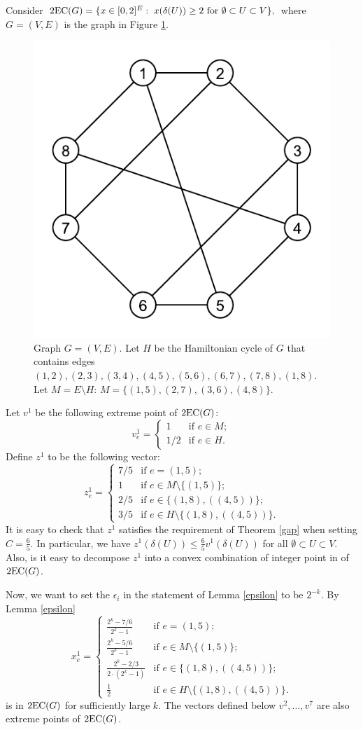 \begin{example}

Consider  $\operatorname{2EC}(G) = \{x\in [0,2]^E: \; x(\delta(U))\geq 2 \mbox{ for $\emptyset \subset U \subset V$}\},$ where $G=(V,E)$ is the graph in Figure \ref{example}. 
\begin{figure}[h]
	\centering
	\includegraphics[width=0.2\linewidth]{example.pdf}
	\caption{Graph $G=(V,E)$. Let $H$ be the Hamiltonian cycle of $G$ that contains edges $(1,2),(2,3),(3,4),(4,5),(5,6),(6,7),(7,8),(1,8)$. Let $M= E\setminus H$: $M=\{(1,5),(2,7),(3,6),(4,8)\}$.}
	\label{example}
\end{figure}

Let $v^1$ be the following extreme point of $\operatorname{2EC}(G)$: \begin{equation*}
v^1_{e} = \left\{ \begin{array}{ll}
1 & \mbox{if $e\in M$};\\
1/2 & \mbox{if $e\in H$}.
\end{array} \right. 
\end{equation*}
Define $z^1$ to be the following vector:
\begin{equation*}
z^1_{e} = \left\{ \begin{array}{ll}
7/5 & \mbox{if $e= (1,5)$};\\
1 & \mbox{if $e\in M\setminus \{(1,5)\}$};\\
2/5 & \mbox{if $e \in \{(1,8),((4,5))\}$};\\
3/5 & \mbox{if $e\in H\setminus\{(1,8),((4,5))\} $}.
\end{array} \right. 
\end{equation*}
It is easy to check that $z^1$ satisfies the requirement of Theorem \ref{gap} when setting $C=\frac{6}{5}$. In particular, we have $ z^1(\delta(U))\leq \frac{6}{5}v^1(\delta(U))$ for all $\emptyset\subset U \subset V$. Also, is it easy to decompose $z^1$ into a convex combination of integer point in of $\operatorname{2EC}(G)$.

Now, we want to set the $\epsilon_i$ in the statement of Lemma \ref{epsilon} to be $2^{-k}$. By Lemma \ref{epsilon}
\begin{equation*}
x^1_{e} = \left\{ \begin{array}{ll}
\frac{2^k-7/6}{2^k-1} & \mbox{if $e= (1,5)$};\\
\frac{2^k-5/6}{2^k-1} & \mbox{if $e\in M\setminus \{(1,5)\}$};\\
\frac{2^k- 2/3}{2\cdot (2^k-1)} & \mbox{if $e \in \{(1,8),((4,5))\}$};\\
\frac{1}{2} & \mbox{if $e\in H\setminus\{(1,8),((4,5))\} $}.
\end{array} \right. 
\end{equation*}
is in $\operatorname{2EC}(G)$ for sufficiently large $k$. The vectors defined below $v^2,\ldots,v^7$ are also extreme points of $\operatorname{2EC}(G)$.


\end{example}
